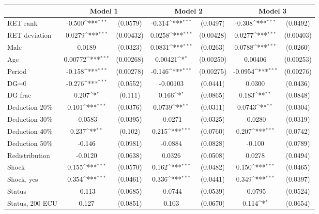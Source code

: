 {
\def\sym#1{\ifmmode^{#1}\else\(^{#1}\)\fi}
\begin{tabular}{l*{3}{cc}}
\hline\hline
                &\multicolumn{2}{c}{Model 1} &\multicolumn{2}{c}{Model 2} &\multicolumn{2}{c}{Model 3} \\
\hline
RET rank        &   -0.500\sym{***}& (0.0579)&   -0.314\sym{***}& (0.0497)&   -0.308\sym{***}& (0.0492)\\
RET deviation   &   0.0279\sym{***}&(0.00432)&   0.0258\sym{***}&(0.00428)&   0.0277\sym{***}&(0.00403)\\
Male            &   0.0189         & (0.0323)&   0.0831\sym{***}& (0.0263)&   0.0788\sym{***}& (0.0260)\\
Age             &  0.00772\sym{***}&(0.00268)&  0.00421\sym{*}  &(0.00250)&  0.00406         &(0.00253)\\
Period          &   -0.158\sym{***}&(0.00278)&   -0.146\sym{***}&(0.00275)&  -0.0954\sym{***}&(0.00276)\\
DG=0            &   -0.276\sym{***}& (0.0552)& -0.00103         & (0.0441)&   0.0300         & (0.0436)\\
DG frac         &    0.207\sym{*}  &  (0.111)&    0.166\sym{*}  & (0.0865)&    0.183\sym{**} & (0.0848)\\
Deduction 20\%  &    0.101\sym{***}& (0.0376)&   0.0739\sym{**} & (0.0311)&   0.0743\sym{**} & (0.0304)\\
Deduction 30\%  &  -0.0583         & (0.0395)&  -0.0271         & (0.0325)&  -0.0280         & (0.0319)\\
Deduction 40\%  &    0.237\sym{**} &  (0.102)&    0.215\sym{***}& (0.0760)&    0.207\sym{***}& (0.0742)\\
Deduction 50\%  &   -0.146         & (0.0981)&  -0.0884         & (0.0828)&   -0.100         & (0.0789)\\
Redistribution  &  -0.0120         & (0.0638)&   0.0326         & (0.0508)&   0.0278         & (0.0494)\\
Shock           &    0.155\sym{***}& (0.0570)&    0.162\sym{***}& (0.0482)&    0.150\sym{***}& (0.0465)\\
Shock, yes      &    0.354\sym{***}& (0.0461)&    0.336\sym{***}& (0.0441)&    0.349\sym{***}& (0.0397)\\
Status          &   -0.113         & (0.0685)&  -0.0744         & (0.0539)&  -0.0795         & (0.0524)\\
Status, 200 ECU &    0.127         & (0.0851)&    0.103         & (0.0670)&    0.114\sym{*}  & (0.0654)\\

\end{tabular}}
